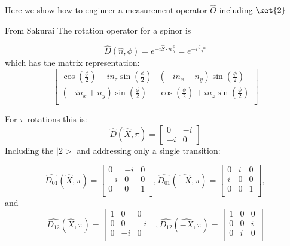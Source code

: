 Here we show how to engineer a measurement operator $\hat{O}$ including $\ket{2}$

From Sakurai The rotation operator for a spinor is

\begin{equation}
    \hat{D}(\hat{n},\phi)=e^{-i \hat{S} \cdot \hat{n} \frac{\phi}{\hbar}}=e^{-i \frac{\hat{\sigma} \cdot \hat{n}}{2} }
\end{equation}
which has the matrix representation:
\begin{equation}
    \begin{bmatrix}
        \cos \left( \frac{\phi}{2} \right) - i n_z \sin \left( {\frac{\phi}{2}} \right) & \left( -i n_x - n_y \right) \sin \left( \frac{\phi}{2} \right)   \\
        \left( -i n_x + n_y \right) \sin \left( \frac{\phi}{2} \right) & \cos \left( \frac{\phi}{2} \right) + i n_z \sin \left( {\frac{\phi}{2}} \right)   \\
    \end{bmatrix}
\end{equation}

For $\pi$ rotations this is:
\begin{equation}
    \hat{D}(\hat{X}, \pi)=
    \begin{bmatrix}
        0 & -i \\
        -i & 0
    \end{bmatrix}
\end{equation}
Including the $|2>$ and addressing only a single transition:

\begin{equation}
    \hat{D_{01}}(\hat{X}, \pi)=
    \begin{bmatrix}
        0  & -i & 0 \\
        -i & 0 & 0 \\
        0  & 0 & 1 \\
    \end{bmatrix},
    \hat{D_{01}}(\hat{-X}, \pi)=
    \begin{bmatrix}
        0  & i & 0 \\
        i & 0 & 0 \\
        0  & 0 & 1 \\
    \end{bmatrix},
\end{equation}
and
\begin{equation}
    \hat{D_{12}}(\hat{X}, \pi)=
    \begin{bmatrix}
        1 & 0 & 0 \\
        0 & 0 & -i \\
        0 & -i & 0 \\
    \end{bmatrix},
    \hat{D_{12}}(\hat{-X}, \pi)=
    \begin{bmatrix}
        1 & 0 & 0 \\
        0 & 0 & i \\
        0 & i & 0 \\
    \end{bmatrix}
\end{equation}

